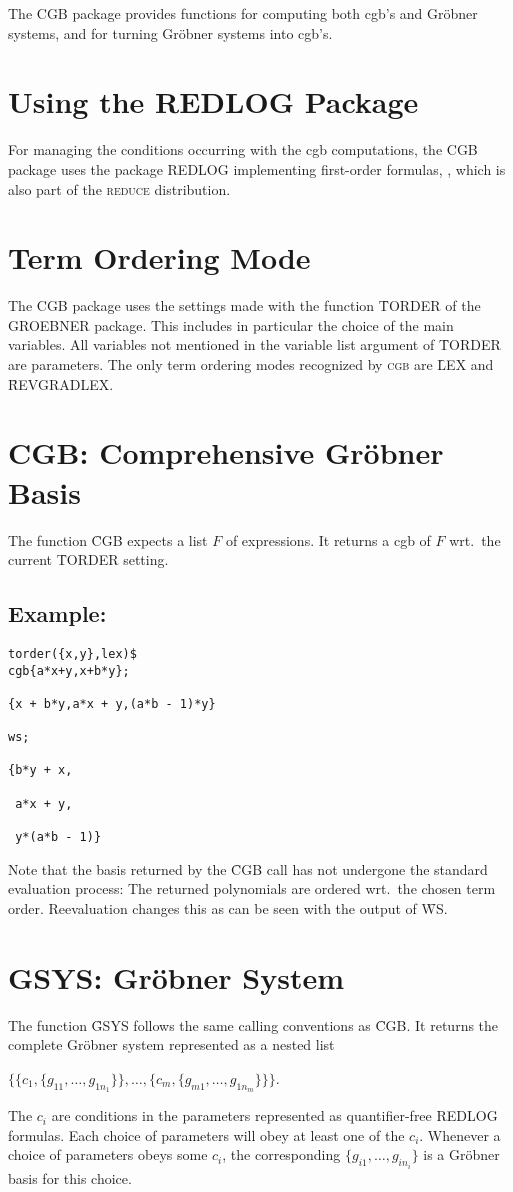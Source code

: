 The CGB package provides functions for computing both {\sc cgb}'s and
Gr\"obner systems, and for turning Gr\"obner systems into {\sc cgb}'s.
%
\section{Using the REDLOG Package}
For managing the conditions occurring with the {\sc cgb} computations,
the CGB package uses the package REDLOG implementing first-order
formulas, \cite{DolzmannSturm:97a,DolzmannSturm:99}, which is also
part of the \textsc{reduce} distribution.
%
\section{Term Ordering Mode}
The CGB package uses the settings made with the function \f{TORDER}
of the GROEBNER package. This includes in particular the choice of the
main variables. All variables not mentioned in the variable list
argument of \f{TORDER} are parameters. The only term ordering modes
recognized by \textsc{cgb} are \f{LEX} and \f{REVGRADLEX}.
%
\section{CGB: Comprehensive Gr\"ob\-ner Basis}
The function \f{CGB} expects a list $F$ of expressions. 
It returns a {\sc cgb} of $F$ wrt.~the current \f{TORDER} setting.
%
\subsection*{Example:}
\begin{verbatim}
torder({x,y},lex)$
cgb{a*x+y,x+b*y};

{x + b*y,a*x + y,(a*b - 1)*y}

ws;

{b*y + x,

 a*x + y,

 y*(a*b - 1)}
\end{verbatim}
Note that the basis returned by the \f{CGB} call has not undergone
the standard evaluation process: The returned polynomials are ordered
wrt.~the chosen term order. Reevaluation changes this as can be seen
with the output of \f{WS}.
%
\section{GSYS: Gr\"obner System}
The function \f{GSYS} follows the same calling conventions as 
\f{CGB}. It returns the complete Gr\"obner system represented as a nested
list
\begin{center}
\begin{tt}
$\bigl\{\bigl\{c_1,\{g_{11},\ldots,g_{1n_1}\}\bigr\},\dots,
\bigl\{c_m,\{g_{m1},\dots,g_{1n_m}\}\bigr\}\bigr\}$.
\end{tt}
\end{center}
The {\tt $c_i$} are conditions in the parameters represented as
quantifier-free REDLOG formulas. Each choice of parameters will obey
at least one of the {\tt $c_i$}. Whenever a choice of parameters obeys
some {\tt $c_i$}, the corresponding {\tt $\{g_{i1},\ldots,g_{in_i}\}$}
is a Gr\"obner basis for this choice.
%
